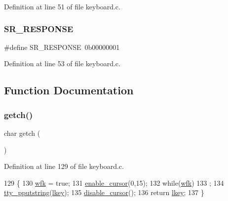 Definition at line 51 of file keyboard.\+c.

\mbox{\label{a00038_ac9efa716f8185bae296975136b510c30_ac9efa716f8185bae296975136b510c30}} 
\subsubsection{\texorpdfstring{S\+R\+\_\+\+R\+E\+S\+P\+O\+N\+SE}{SR\_RESPONSE}}
{\footnotesize\ttfamily \#define S\+R\+\_\+\+R\+E\+S\+P\+O\+N\+SE~0b00000001}



Definition at line 53 of file keyboard.\+c.



\subsection{Function Documentation}
\mbox{\label{a00038_af3facad10e05defa48d45b46eb9ebe7e_af3facad10e05defa48d45b46eb9ebe7e}} 
\subsubsection{\texorpdfstring{getch()}{getch()}}
{\footnotesize\ttfamily char getch (\begin{DoxyParamCaption}{ }\end{DoxyParamCaption})}



Definition at line 129 of file keyboard.\+c.


\begin{DoxyCode}
129              \{
130     \hyperlink{a00038_a6ddd5223379778858edc46ffbec19775_a6ddd5223379778858edc46ffbec19775}{wfk} = \textcolor{keyword}{true};
131     \hyperlink{a00173_afe197dc4dbfa6036ef04abd2aeeeca2d_afe197dc4dbfa6036ef04abd2aeeeca2d}{enable\_cursor}(0,15);
132     \textcolor{keywordflow}{while}(\hyperlink{a00038_a6ddd5223379778858edc46ffbec19775_a6ddd5223379778858edc46ffbec19775}{wfk})
133         ;
134     \hyperlink{a00173_ade960b1320324706aac6c00cc6b1b2fe_ade960b1320324706aac6c00cc6b1b2fe}{tty\_pputstring}(\hyperlink{a00038_ade374650022cb30c4f5591a8dafad685_ade374650022cb30c4f5591a8dafad685}{lkey});
135     \hyperlink{a00173_a3d09038c7b6436e60b228f2f3f451f6a_a3d09038c7b6436e60b228f2f3f451f6a}{disable\_cursor}();
136     \textcolor{keywordflow}{return} \hyperlink{a00038_ade374650022cb30c4f5591a8dafad685_ade374650022cb30c4f5591a8dafad685}{lkey};
137 \}
\end{DoxyCode}
\mbox{\label{a00038_aa7ee03b27a489828ce588d0fc023cab3_aa7ee03b27a489828ce588d0fc023cab3}} 
